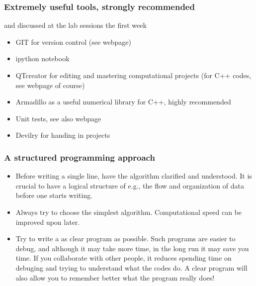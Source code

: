 \documentclass[compress]{beamer}
\begin{document}
\frame
{
  \frametitle{Extremely useful tools, strongly recommended}
  \begin{block}{and discussed at the lab sessions the first week}
\begin{itemize}
\item GIT  for version control (see webpage)
\item ipython notebook
\item QTcreator for editing and mastering computational projects (for C++ codes, see webpage of course)
\item Armadillo as a useful numerical library for C++, highly recommended
\item Unit tests, see also webpage
\item Devilry for handing in projects
\end{itemize}
  \end{block}
}



\frame
{
  \frametitle{A structured programming approach}
\begin{small}
{\scriptsize
        \begin{itemize}
\item Before writing a single line, have the algorithm clarified and
understood. It is crucial to have a logical structure of e.g., the flow
and organization of data before one starts writing.
%
\item Always try  to choose the simplest algorithm. Computational speed
can be improved upon later.
%
\item Try to write a as clear program as possible. Such programs are
easier to debug, and although it may take more time, in the long run
it may save you time. If you collaborate with other people, it
reduces spending time on debuging and
trying to understand what the codes do. A clear program will also allow
you to remember better what the program really does!

         \end{itemize}
}
\end{small}
}
\end{document}
